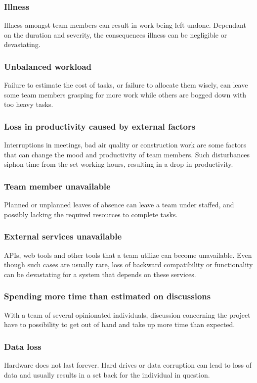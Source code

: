 \subsubsection{Illness}
Illness amongst team members can result in work being left undone. Dependant on the duration and severity, the consequences illness can be negligible or devastating. 

\subsubsection{Unbalanced workload}
Failure to estimate the cost of tasks, or failure to allocate them wisely, can leave some team members grasping for more work while others are bogged down with too heavy tasks.

\subsubsection{Loss in productivity caused by external factors}
Interruptions in meetings, bad air quality or construction work are some factors that can change the mood and productivity of team members. Such disturbances siphon time from the set working hours, resulting in a drop in productivity. 

\subsubsection{Team member unavailable}
Planned or unplanned leaves of absence can leave a team under staffed, and possibly lacking the required resources to complete tasks.

\subsubsection{External services unavailable}
APIs, web tools and other tools that a team utilize can become unavailable. Even though such cases are usually rare, loss of backward compatibility or functionality can be devastating for a system that depends on these services.

\subsubsection{Spending more time than estimated on discussions}
With a team of several opinionated individuals, discussion concerning the project have to possibility to get out of hand and take up more time than expected.

\subsubsection{Data loss}
Hardware does not last forever. Hard drives or data corruption can lead to loss of data and usually results in a set back for the individual in question.

